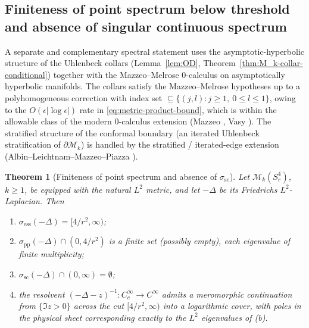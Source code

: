 \documentclass[11pt,letterpaper]{article}
\newtheorem{theorem}{Theorem}[section]
\theoremstyle{definition}
\newcommand{\cM}{\mathcal{M}}
\newcommand{\Lap}{\Delta}
\begin{document}
\subsection{Finiteness of point spectrum below threshold and absence of singular continuous spectrum}\label{sec:MM-finiteness}

A separate and complementary spectral statement uses the asymptotic-hyperbolic structure of the Uhlenbeck collars (Lemma~\ref{lem:OD}, Theorem~\ref{thm:M_k-collar-conditional}) together with the Mazzeo--Melrose 0-calculus on asymptotically hyperbolic manifolds. The collars satisfy the Mazzeo--Melrose hypotheses up to a polyhomogeneous correction with index set $\subseteq \{(j,l) : j \ge 1,\ 0 \le l \le 1\}$, owing to the $O(\epsilon|\log\epsilon|)$ rate in \eqref{eq:metric-product-bound}, which is within the allowable class of the modern 0-calculus extension (Mazzeo \cite{Mazzeo1991}, Vasy \cite{Vasy2013}). The stratified structure of the conformal boundary (an iterated Uhlenbeck stratification of $\partial\cM_k$) is handled by the stratified / iterated-edge extension (Albin--Leichtnam--Mazzeo--Piazza \cite{ALMP2012}).

\begin{theorem}[Finiteness of point spectrum and absence of $\sigma_{\mathrm{sc}}$]\label{thm:MM-finiteness}
Let $\cM_k(S^4_r)$, $k \ge 1$, be equipped with the natural $L^2$ metric, and let $-\Lap$ be its Friedrichs $L^2$-Laplacian. Then
\begin{enumerate}
\item[(a)] $\sigma_{\mathrm{ess}}(-\Lap) = [4/r^2, \infty)$;
\item[(b)] $\sigma_{\mathrm{pp}}(-\Lap)\cap (0, 4/r^2)$ is a finite set (possibly empty), each eigenvalue of finite multiplicity;
\item[(c)] $\sigma_{\mathrm{sc}}(-\Lap)\cap(0, \infty) = \emptyset$;
\item[(d)] the resolvent $(-\Lap - z)^{-1}: C_c^\infty \to C^\infty$ admits a meromorphic continuation from $\{\Im z > 0\}$ across the cut $[4/r^2,\infty)$ into a logarithmic cover, with poles in the physical sheet corresponding exactly to the $L^2$ eigenvalues of (b).
\end{enumerate}
\end{theorem}
\end{document}
